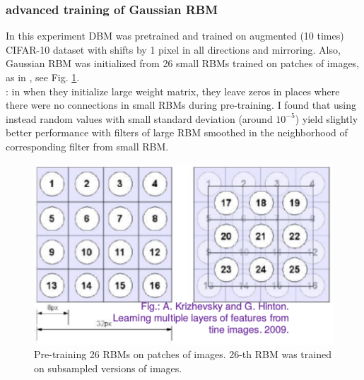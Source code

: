 \clearpage
\newpage
\subsubsection{advanced training of Gaussian RBM}
In this experiment DBM was pretrained and trained on augmented (10 times) CIFAR-10 dataset with shifts by 1 pixel in all directions and mirroring. Also, Gaussian RBM was initialized from 26 small RBMs trained on patches of images, as in \cite{krizhevsky2009learning}, see Fig. \ref{fig:small_rbms}.
\\
: in \cite{krizhevsky2009learning} when they initialize large weight matrix, they leave zeros in places where there were no connections in small RBMs during pre-training. I found that using instead random values with small standard deviation (around $10^{-5}$) yield slightly better performance with filters of large RBM smoothed in the neighborhood of corresponding filter from small RBM.
\begin{figure}[h]
\begin{mdframed}
\includegraphics[scale=0.75]{img/small_rbms.png}
\centering
\caption{Pre-training 26 RBMs on patches of images. 26-th RBM was trained on subsampled versions of images.}
\label{fig:small_rbms}
\end{mdframed}
\end{figure}

